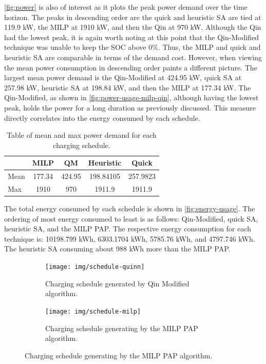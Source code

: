 \documentclass[energies,article,submit,moreauthors]{Definitions/mdpi}
\begin{document}
\ref{fig:power} is also of interest as it plots the peak power demand over the time horizon. The peaks in descending
order are the quick and heuristic SA are tied at 119.9 kW, the MILP at 1910 kW, and then the Qin at 970 kW. Although the
Qin had the lowest peak, it is again worth noting at this point that the Qin-Modified technique was unable to keep the
SOC above 0\%. Thus, the MILP and quick and heuristic SA are comparable in terms of the demand cost. However, when
viewing the mean power consumption in descending order paints a different picture. The largest mean power demand is the
Qin-Modified at 424.95 kW, quick SA at 257.98 kW, heuristic SA at 198.84 kW, and then the MILP at 177.34 kW. The
Qin-Modified, as shown in \ref{fig:power-usage-milp-qin}, although having the lowest peak, holds the power for a long
duration as previously discussed. This measure directly correlates into the energy consumed by each schedule.

\begin{table}[htbp]
\caption{\label{tab:power}Table of mean and max power demand for each charging schedule.}
\centering
\begin{tabular}{|l|cccc|}
\hline
 & MILP & QM & Heuristic & Quick\\[0pt]
\hline
Mean & 177.34 & 424.95 & 198.84105 & 257.9823\\[0pt]
Max & 1910 & 970 & 1911.9 & 1911.9\\[0pt]
\hline
\end{tabular}
\end{table}

The total energy consumed by each schedule is shown in \ref{fig:energy-usage}. The ordering of most energy consumed to
least is as follows: Qin-Modified, quick SA, heuristic SA, and the MILP PAP. The respective energy consumption for each
technique is: 10198.799 kWh, 6303.1704 kWh, 5785.76 kWh, and 4797.746 kWh. The heuristic SA consuming about 988 kWh more
than the MILP PAP.

\begin{figure}
  \centering
  \begin{subfigure}[t]{\textwidth}
    \centering
    \texttt{[image: img/schedule-quinn]}
    \caption{Charging schedule generated by Qin Modified algorithm.}
    \label{subfig:schedule-qin}
  \end{subfigure}

  \hfill

  \begin{subfigure}[t]{\textwidth}
    \centering
    \texttt{[image: img/schedule-milp]}
    \caption{Charging schedule generating by the MILP PAP algorithm.}
    \label{subfig:schedule-milp}
  \end{subfigure}
\end{figure}
\end{document}
